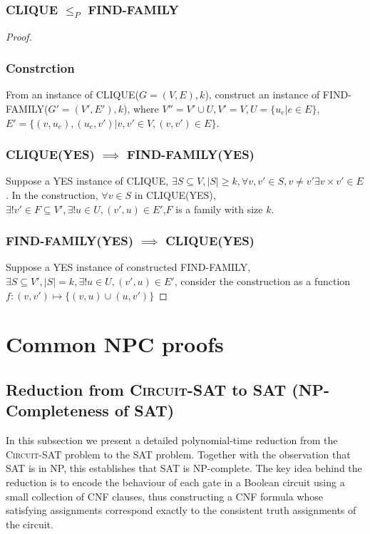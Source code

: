 \documentclass[9pt]{extarticle}
\begin{document}
\subsubsection*{CLIQUE $\leq_P$ FIND-FAMILY}
\begin{proof}
  \subsubsection*{Constrction}
  From an instance of CLIQUE($G = (V, E), k$), construct an instance of FIND-FAMILY($G' = (V', E'), k$), 
  where $V'' = V' \cup U, V' = V, U = \{u_e | e \in E\}$,
  $E' = \{(v, u_e),  (u_e, v')| v, v' \in V, (v, v') \in E\}$. 
  \subsubsection*{CLIQUE(YES) $\implies$ FIND-FAMILY(YES)}
  Suppose a YES instance of CLIQUE, $\exists S\subseteq V, |S| \geq k, \forall v, v' \in S, v \neq v'\exists 
  v \times v' \in E$. In the construction, $\forall v \in S$ in CLIQUE(YES), 
  $\exists! v' \in F \subseteq V', \exists! u \in U, (v', u) \in E'$,$F$ is a family with size $k$.
  \subsubsection*{FIND-FAMILY(YES) $\implies$ CLIQUE(YES)}
  Suppose a YES instance of constructed FIND-FAMILY, $\exists S \subseteq V', |S| = k, \exists! u \in U, (v', u) \in E'$, consider the
  construction as a function $f: (v, v') \mapsto \{(v, u) \cup (u, v')\}$
\end{proof}
\newpage
\section{Common NPC proofs}
\subsection{Reduction from \textsc{Circuit-SAT} to \textsc{SAT} (NP-Completeness of SAT)}

In this subsection we present a detailed polynomial-time reduction from the
\textsc{Circuit-SAT} problem to the \textsc{SAT} problem.  Together with the
observation that \textsc{SAT} is in NP, this establishes that \textsc{SAT} is
NP-complete.  The key idea behind the reduction is to encode the behaviour of
each gate in a Boolean circuit using a small collection of CNF clauses, thus
constructing a CNF formula whose satisfying assignments correspond exactly to the
consistent truth assignments of the circuit.
\end{document}
